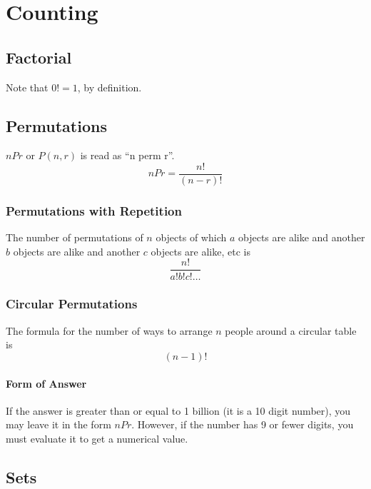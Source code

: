 \documentclass[letterpaper, 12pt]{report}
\theoremstyle{definition}
\numberwithin{equation}{section}
\begin{document}
\section{Counting}
\subsection{Factorial}
Note that $0 ! = 1$, by definition.

\subsection{Permutations}
$nPr$ or $P(n,r)$ is read as ``n perm r''.
\begin{equation}
	nPr = \frac{n!}{(n-r)!}
\end{equation}

\subsubsection{Permutations with Repetition}
The number of permutations of $n$ objects of which $a$ objects are alike and another $b$ objects are alike and another $c$ objects are alike, etc is
\begin{equation*}
	\frac{n!}{a!b!c!\dots}
\end{equation*}

\subsubsection{Circular Permutations}
The formula for the number of ways to arrange $n$ people around a circular table is
\begin{equation*}
	(n-1)!
\end{equation*}


\paragraph{Form of Answer}
If the answer is greater than or equal to 1 billion (it is a 10 digit number), you may leave it in the form $nPr$. However, if the number has 9 or fewer digits, you must evaluate it to get a numerical value.

\subsection{Sets}
\end{document}
